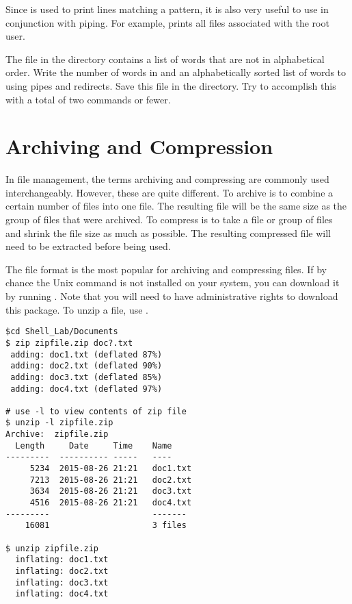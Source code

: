 Since  is used to print lines matching a pattern, it is also very useful to use in conjunction with piping.
For example,  prints all files associated with the root user.

\begin{problem}
The  file in the  directory contains a list of words that are not in alphabetical order.
Write the number of words in  and an alphabetically sorted list of words to  using pipes and redirects.
Save this file in the  directory.
Try to accomplish this with a total of two commands or fewer.
\end{problem}

\section*{Archiving and Compression}
In file management, the terms archiving and compressing are commonly used interchangeably.
However, these are quite different.
To archive is to combine a certain number of files into one file.
The resulting file will be the same size as the group of files that were archived.
To compress is to take a file or group of files and shrink the file size as much as possible.
The resulting compressed file will need to be extracted before being used.

The  file format is the most popular for archiving and compressing files.
If by chance the  Unix command is not installed on your system, you can download it by running .
Note that you will need to have administrative rights to download this package.
To unzip a file, use . 

\begin{lstlisting}
$cd Shell_Lab/Documents
$ zip zipfile.zip doc?.txt
 adding: doc1.txt (deflated 87%)
 adding: doc2.txt (deflated 90%)
 adding: doc3.txt (deflated 85%)
 adding: doc4.txt (deflated 97%)

# use -l to view contents of zip file
$ unzip -l zipfile.zip
Archive:  zipfile.zip
  Length     Date     Time    Name
---------  ---------- -----   ----
     5234  2015-08-26 21:21   doc1.txt
     7213  2015-08-26 21:21   doc2.txt
     3634  2015-08-26 21:21   doc3.txt
     4516  2015-08-26 21:21   doc4.txt
---------                     -------
    16081                     3 files
    
$ unzip zipfile.zip
  inflating: doc1.txt                
  inflating: doc2.txt                
  inflating: doc3.txt
  inflating: doc4.txt
\end{lstlisting}

